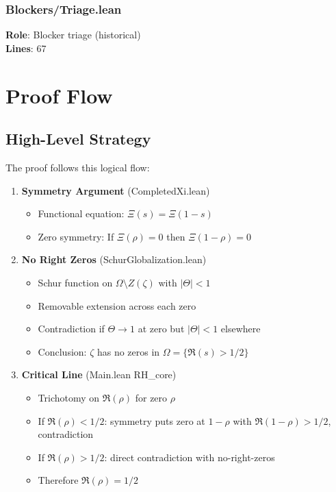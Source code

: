 \documentclass[12pt,a4paper]{article}
\begin{document}
\subsubsection{Blockers/Triage.lean}
\textbf{Role}: Blocker triage (historical)\\
\textbf{Lines}: 67

\section{Proof Flow}

\subsection{High-Level Strategy}

The proof follows this logical flow:

\begin{enumerate}
    \item \textbf{Symmetry Argument} (CompletedXi.lean)
    \begin{itemize}
        \item Functional equation: $\Xi(s) = \Xi(1-s)$
        \item Zero symmetry: If $\Xi(\rho) = 0$ then $\Xi(1-\rho) = 0$
    \end{itemize}
    
    \item \textbf{No Right Zeros} (SchurGlobalization.lean)
    \begin{itemize}
        \item Schur function on $\Omega \setminus Z(\zeta)$ with $|\Theta| < 1$
        \item Removable extension across each zero
        \item Contradiction if $\Theta \to 1$ at zero but $|\Theta| < 1$ elsewhere
        \item Conclusion: $\zeta$ has no zeros in $\Omega = \{\Re(s) > 1/2\}$
    \end{itemize}
    
    \item \textbf{Critical Line} (Main.lean RH\_core)
    \begin{itemize}
        \item Trichotomy on $\Re(\rho)$ for zero $\rho$
        \item If $\Re(\rho) < 1/2$: symmetry puts zero at $1-\rho$ with $\Re(1-\rho) > 1/2$, contradiction
        \item If $\Re(\rho) > 1/2$: direct contradiction with no-right-zeros
        \item Therefore $\Re(\rho) = 1/2$
    \end{itemize}
\end{enumerate}
\end{document}
